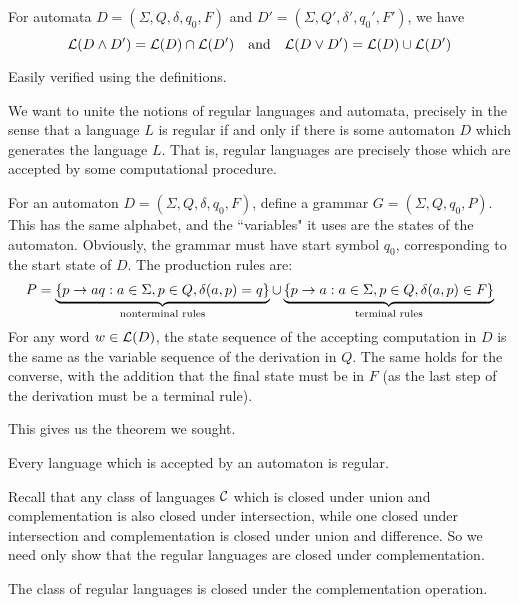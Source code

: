 \documentclass{article}
\begin{document}
\begin{proposition}
	For automata $D = (\Sigma, Q, \delta, q_0, F)$ and $D' = (\Sigma, Q', \delta', q_0', F')$, we have
	\[
		\mathcal{L}(D \land D') = \mathcal{L}(D) \cap \mathcal{L}(D') \quad \text{and} \quad \mathcal{L}(D \lor D') = \mathcal{L}(D) \cup \mathcal{L}(D')
	\]
\end{proposition}

\begin{prf}
	Easily verified using the definitions.
\end{prf}

We want to unite the notions of regular languages and automata, precisely in the sense that a language $L$ is regular if and only if there is some automaton $D$ which generates the language $L$. That is, regular languages are precisely those which are accepted by some computational procedure.

For an automaton $D = (\Sigma, Q, \delta, q_0, F)$, define a grammar $G = (\Sigma, Q, q_0, P)$. This has the same alphabet, and the ``variables" it uses are the states of the automaton. Obviously, the grammar must have start symbol $q_0$, corresponding to the start state of $D$. The production rules are:
\[
	P = \underbrace{\left\lbrace p \to aq : a \in \Sigma, p \in Q, \delta(a, p) = q \right\rbrace}_{\text{nonterminal rules}} \cup \underbrace{\left\lbrace p \to a: a \in \Sigma, p \in Q,  \delta(a, p) \in F \right\rbrace}_{\text{terminal rules}}
\]
For any word $w \in \mathcal{L}(D)$, the state sequence of the accepting computation in $D$ is the same as the variable sequence of the derivation in $Q$. The same holds for the converse, with the addition that the final state must be in $F$ (as the last step of the derivation must be a terminal rule). 

This gives us the theorem we sought.
\begin{theorem}
	\label{automata-are-regular-languages}
	Every language which is accepted by an automaton is regular.
\end{theorem}

Recall that any class of languages $\mathcal{C}$ which is closed under union and complementation is also closed under intersection, while one closed under intersection and complementation is closed under union and difference. So we need only show that the regular languages are closed under complementation.

\begin{proposition}
	The class of regular languages is closed under the complementation operation.
\end{proposition}
\end{document}
